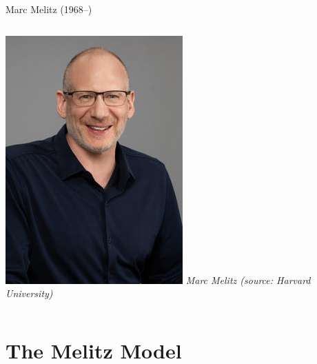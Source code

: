 \documentclass[notes,11pt, aspectratio=169, xcolor=table]{beamer}
\begin{document}
\begin{frame}{Marc Melitz (1968–)}
\begin{columns}
    \begin{column}{0.35\textwidth}
        \centering
        \includegraphics[width=\linewidth]{figs/melitz_marc030r.jpeg} 
        \vspace{0.2cm}
        \scriptsize\textit{Marc Melitz (source: Harvard University)}
    \end{column}
\end{columns}
\end{frame}


\section{The Melitz Model}
\end{document}
